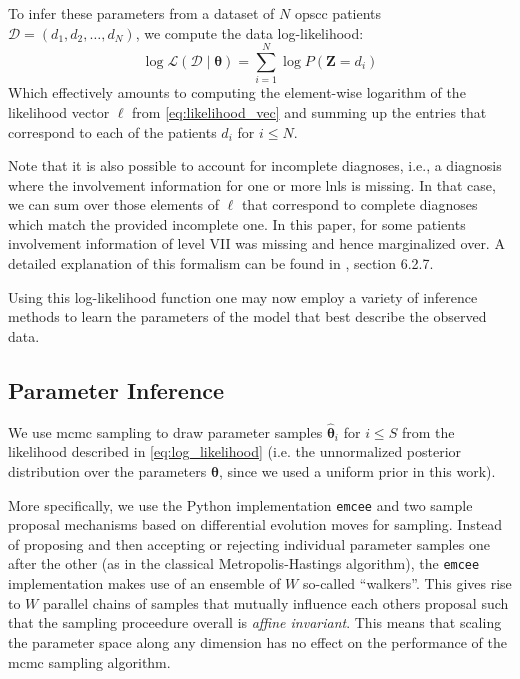 \documentclass[twocolumn]{aastex631}
\begin{document}
To infer these parameters from a dataset of $N$ \gls{opscc} patients $\boldsymbol{\mathcal{D}} = \left( d_1, d_2, \ldots, d_N \right)$, we compute the data log-likelihood:
%
\begin{equation} \label{eq:log_likelihood}
    \log\mathcal{L} \left( \boldsymbol{\mathcal{D}} \mid \boldsymbol{\theta} \right) = \sum_{i=1}^N \log P \left( \mathbf{Z} = d_i \right)
\end{equation}
%
Which effectively amounts to computing the element-wise logarithm of the likelihood vector $\boldsymbol{\ell}$ from \autoref{eq:likelihood_vec} and summing up the entries that correspond to each of the patients $d_i$ for $i\leq N$.

Note that it is also possible to account for incomplete diagnoses, i.e., a diagnosis where the involvement information for one or more \glspl{lnl} is missing. In that case, we can sum over those elements of $\boldsymbol{\ell}$ that correspond to complete diagnoses which match the provided incomplete one. In this paper, for some patients involvement information of level VII was missing and hence marginalized over. A detailed explanation of this formalism can be found in \citep{zora231470}, section 6.2.7.

Using this log-likelihood function one may now employ a variety of inference methods to learn the parameters of the model that best describe the observed data.


\subsection{Parameter Inference}
\label{subsec:formalism:inference}

We use \gls{mcmc} sampling to draw parameter samples $\boldsymbol{\hat{\theta}}_i$ for $i \leq S$ from the likelihood described in \autoref{eq:log_likelihood} (i.e. the unnormalized posterior distribution over the parameters $\boldsymbol{\theta}$, since we used a uniform prior in this work).

More specifically, we use the Python implementation \texttt{emcee} \citep{foreman-mackey_emcee_2013} and two sample proposal mechanisms based on differential evolution moves \citep{ter_braak_differential_2008,nelson_run_2013} for sampling. Instead of proposing and then accepting or rejecting individual parameter samples one after the other (as in the classical Metropolis-Hastings algorithm), the \texttt{emcee} implementation makes use of an ensemble of $W$ so-called ``walkers''. This gives rise to $W$ parallel chains of samples that mutually influence each others proposal such that the sampling proceedure overall is \emph{affine invariant}. This means that scaling the parameter space along any dimension has no effect on the performance of the \gls{mcmc} sampling algorithm.
\end{document}

